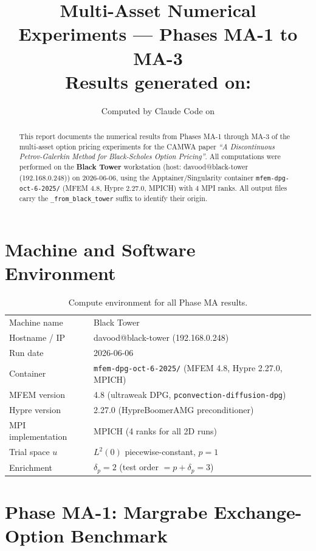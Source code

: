 \documentclass[11pt,a4paper]{article}
\title{\textbf{Multi-Asset Numerical Experiments --- Phases MA-1 to MA-3}\\[4pt]
\large Results generated on: \machinename}
\author{Computed by Claude Code on \machinehost}
\date{\rundate}
\makeatletter
\newcommand{\machinename}{Black Tower}
\newcommand{\machinehost}{davood@black-tower (192.168.0.248)}
\newcommand{\rundate}{2026-06-06}
\newcommand{\container}{\texttt{mfem-dpg-oct-6-2025/} (MFEM 4.8, Hypre 2.27.0, MPICH)}
\makeatother
\begin{document}
\maketitle
\thispagestyle{empty}

\begin{abstract}
This report documents the numerical results from Phases MA-1 through MA-3 of the
multi-asset option pricing experiments for the CAMWA paper
\emph{``A Discontinuous Petrov-Galerkin Method for Black-Scholes Option Pricing''}.
All computations were performed on the \textbf{\machinename} workstation
(host: \machinehost) on \rundate, using the Apptainer/Singularity container
\container{} with 4 MPI ranks.
All output files carry the \texttt{\_from\_black\_tower} suffix to identify their origin.
\end{abstract}

\tableofcontents
\newpage

\section{Machine and Software Environment}

\begin{table}[H]
\centering
\caption{Compute environment for all Phase MA results.}
\begin{tabular}{ll}
\toprule
Machine name        & \machinename \\
Hostname / IP       & \machinehost \\
Run date            & \rundate \\
Container           & \container \\
MFEM version        & 4.8 (ultraweak DPG, \texttt{pconvection-diffusion-dpg}) \\
Hypre version       & 2.27.0 (HypreBoomerAMG preconditioner) \\
MPI implementation  & MPICH (4 ranks for all 2D runs) \\
Trial space $u$     & $L^2(0)$ piecewise-constant, $p=1$ \\
Enrichment          & $\delta_p=2$ (test order $= p + \delta_p = 3$) \\
\bottomrule
\end{tabular}
\end{table}

\section{Phase MA-1: Margrabe Exchange-Option Benchmark}
\end{document}
